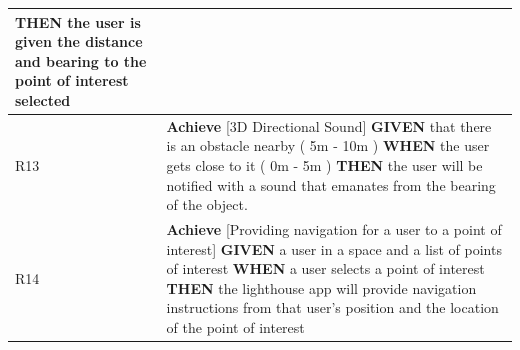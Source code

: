 \documentclass[prodmode,acmtosem]{acmsmall} %
\begin{document}
\begin{center}
\begin{tabularx}{\textwidth}{| p{1.5em} | X |}
		\textbf{THEN} the user is given the distance and bearing to the point of interest selected \\  
 \hline
 R13 & 
 		\textbf{Achieve} [3D Directional Sound]\newline\newline
 		\textbf{GIVEN} that there is an obstacle nearby ( 5m - 10m )\newline
		\textbf{WHEN} the user gets close to it ( 0m - 5m )\newline
		\textbf{THEN} the user will be notified with a sound that emanates from the bearing of the object. \\  
 \hline
 R14 & 
 		\textbf{Achieve} [Providing navigation for a user to a point of interest]\newline\newline
 		\textbf{GIVEN} a user in a space and a list of points of interest\newline
		\textbf{WHEN} a user selects a point of interest\newline
		\textbf{THEN} the lighthouse app will provide navigation instructions from that user’s position and the location of the point of interest\\  
 \hline
\end{tabularx}
\label{tab:requirements}
\end{center}
\end{document}
